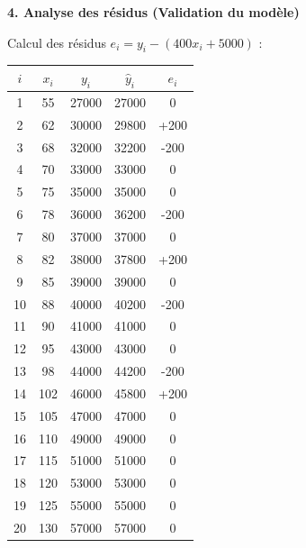 \documentclass[11pt]{article}
\begin{document}
\begin{exoresolu}
\textbf{4. Analyse des résidus (Validation du modèle)}\par
Calcul des résidus $e_i = y_i - (400 x_i + 5000)$ :
\begin{center}
\begin{tabular}{|c|c|c|c|c|}\hline
$i$ & $x_i$ & $y_i$ & $\hat{y}_i$ & $e_i$ \\ \hline
1 & 55 & \num{27000} & \num{27000} & 0 \\
2 & 62 & \num{30000} & \num{29800} & +200 \\
3 & 68 & \num{32000} & \num{32200} & -200 \\
4 & 70 & \num{33000} & \num{33000} & 0 \\
5 & 75 & \num{35000} & \num{35000} & 0 \\
6 & 78 & \num{36000} & \num{36200} & -200 \\
7 & 80 & \num{37000} & \num{37000} & 0 \\
8 & 82 & \num{38000} & \num{37800} & +200 \\
9 & 85 & \num{39000} & \num{39000} & 0 \\
10 & 88 & \num{40000} & \num{40200} & -200 \\ \hline
11 & 90 & \num{41000} & \num{41000} & 0 \\
12 & 95 & \num{43000} & \num{43000} & 0 \\
13 & 98 & \num{44000} & \num{44200} & -200 \\
14 & 102 & \num{46000} & \num{45800} & +200 \\
15 & 105 & \num{47000} & \num{47000} & 0 \\
16 & 110 & \num{49000} & \num{49000} & 0 \\
17 & 115 & \num{51000} & \num{51000} & 0 \\
18 & 120 & \num{53000} & \num{53000} & 0 \\
19 & 125 & \num{55000} & \num{55000} & 0 \\
20 & 130 & \num{57000} & \num{57000} & 0 \\ \hline
\end{tabular}
\end{center}


\end{exoresolu}
\end{document}

